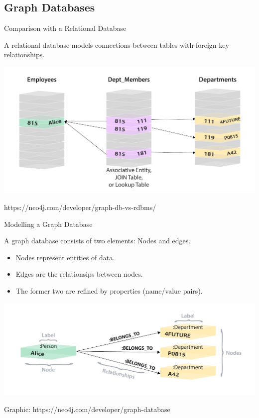 \documentclass{beamer}
\begin{document}
  \subsection{Graph Databases}

    \begin{frame}{Comparison with a Relational Database}
    
      A relational database models connections between tables with foreign key relationships.
      
      \begin{center}
        \includegraphics[scale=.2]{relational_as_graph}
      \end{center}
      
      https://neo4j.com/developer/graph-db-vs-rdbms/
      
    \end{frame}
    
    \begin{frame}{Modelling a Graph Database}

      A graph database consists of two elements: Nodes and edges.

      \begin{itemize}

        \item Nodes represent entities of data.
        \item Edges are the relationsips between nodes.\pause
        \item The former two are refined by properties (name/value pairs).
      \end{itemize}
      
      \begin{center}
        \includegraphics[scale=.2]{relational_graph_model}
      \end{center}
      
      Graphic: https://neo4j.com/developer/graph-database
      
    \end{frame}
    
\end{document}
